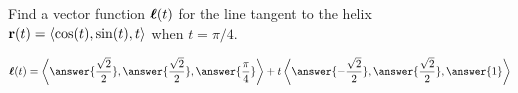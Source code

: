 \documentclass{ximera}
\author{David Guichard \and Neal Koblitz \and H. Jerome Keisler \and Albert Scheller \and Barry Balof \and Mike Wills \and Matthew Carr}
\begin{document}
\begin{exercise}




Find a vector function $\boldsymbol{\ell}(t)$ for the line tangent to the helix $\mathbf{r}(t)=\left\langle \cos(t),\sin(t),t\right\rangle$ when $t=\pi/4$.

\begin{prompt}
\[
\vecl(t)=\vector{\answer{\frac{\sqrt{2}}{2}},\answer{\frac{\sqrt{2}}{2}},\answer{\frac{\pi}{4}}}+t\vector{\answer{-\frac{\sqrt{2}}{2}},\answer{\frac{\sqrt{2}}{2}},\answer{1}}
\]
\end{prompt}


\end{exercise}
\end{document}
